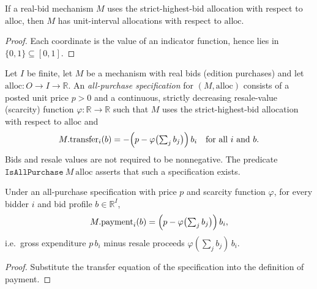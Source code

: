 \begin{lemma}\label{thm:MathEconLib.Mechanism.Auctions.UsesStrictHighestBidAllocation.isUnitIntervalAllocation}\leanok
{}
If a real-bid mechanism $M$ uses the strict-highest-bid allocation with respect to $\mathrm{alloc}$, then $M$ has unit-interval allocations with respect to $\mathrm{alloc}$.
\end{lemma}
\begin{proof}\leanok
{}
Each coordinate is the value of an indicator function, hence lies in $\{0,1\}\subseteq[0,1]$.
\end{proof}

\begin{definition}\label{def:MathEconLib.Mechanism.Auctions.AllPurchaseSpec}\leanok
{}
Let $I$ be finite, let $M$ be a mechanism with real bids (edition purchases) and let $\mathrm{alloc}:O\to I\to\mathbb{R}$. An \emph{all-purchase specification} for $(M,\mathrm{alloc})$ consists of a posted unit price $p>0$ and a continuous, strictly decreasing resale-value (scarcity) function $\varphi:\mathbb{R}\to\mathbb{R}$ such that $M$ uses the strict-highest-bid allocation with respect to $\mathrm{alloc}$ and
\[
M.\mathrm{transfer}_i(b)=-\Bigl(p-\varphi\bigl(\textstyle\sum_j b_j\bigr)\Bigr)\,b_i\quad\text{for all } i \text{ and } b.
\]
Bids and resale values are not required to be nonnegative. The predicate $\texttt{IsAllPurchase}\ M\ \mathrm{alloc}$ asserts that such a specification exists.
\end{definition}

\begin{lemma}\label{thm:MathEconLib.Mechanism.Auctions.AllPurchaseSpec.payment_eq}\leanok
{}
Under an all-purchase specification with price $p$ and scarcity function $\varphi$, for every bidder $i$ and bid profile $b\in\mathbb{R}^I$,
\[
M.\mathrm{payment}_i(b)=\Bigl(p-\varphi\bigl(\textstyle\sum_j b_j\bigr)\Bigr)\,b_i,
\]
i.e.\ gross expenditure $p\,b_i$ minus resale proceeds $\varphi(\sum_j b_j)\,b_i$.
\end{lemma}
\begin{proof}\leanok
{}
Substitute the transfer equation of the specification into the definition of payment.
\end{proof}

